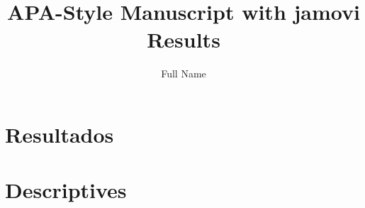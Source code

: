 \documentclass[a4paper,man,hidelinks,floatsintext,x11names]{apa7}
\title{APA-Style Manuscript with jamovi Results}
\author{Full Name}
\affiliation{Your Affilitation}
\begin{document}









\section{Resultados}

           
      
        
      
    
      
      
    
            
\section{Descriptives}

           
      
\end{document}
